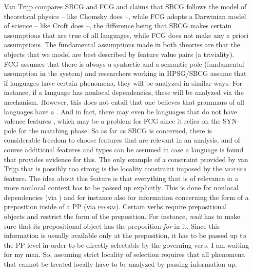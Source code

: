 
Van Trijp compares SBCG and FCG and claims that SBCG follows the model of theoretical physics --
like Chomsky does --, while FCG adopts a Darwinian model of science -- like Croft does --, the difference
being that SBCG makes certain assumptions that are true of all languages, while FCG does not make
any a priori assumptions. The fundamental assumptions made in both theories are that the
objects that we model are best described by feature value pairs (a triviality). FCG assumes that
there is always a syntactic and a semantic pole (fundamental assumption in the system) and
researchers working in HPSG/SBCG assume that if languages have certain phenomena, they will be
analyzed in similar ways. For instance, if a language has nonlocal dependencies, these will be
analyzed via the \slasch mechanism. However, this does not entail that one believes that grammars of
all languages have a \slashf. And in fact, there may even be languages that do not have valence
features \citep{KM2010a-u}, which may be a problem for FCG since it relies on the SYN-pole for the
matching phase. So as far as SBCG is concerned, there is considerable freedom to choose features
that are relevant in an analysis, and of course additional features and types can be assumed in case
a language is found that provides evidence for this. The only example of a constraint provided by van Trijp that is possibly too strong
 is the locality constraint imposed by the \textsc{mother}
feature. The idea about this feature is that everything that is of relevance in a more nonlocal
context has to be passed up explicitly. This is done for nonlocal dependencies (via \slasch) and for instance also
for information concerning the form of a preposition inside of a PP (via \textsc{pform}). Certain verbs require prepositional objects and restrict
the form of the preposition. For instance, \emph{wait} has to make sure that its prepositional
object has the preposition \emph{for} in it. Since this information is usually available only at the
preposition, it has to be passed up to the PP level in order to be directly selectable by the
governing verb. 
\ea
I am waiting for my man.
\z 
So, assuming strict locality of selection requires that all phenomena that cannot be treated locally
have to be analyzed by passing information up.
